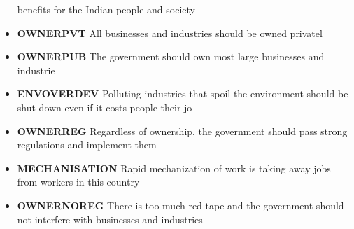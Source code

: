 \documentclass[
]{article}
\begin{document}
\begin{itemize}
  benefits for the Indian people and society
\item
  \textbf{OWNERPVT} All businesses and industries should be owned
  privatel
\item
  \textbf{OWNERPUB} The government should own most large businesses and
  industrie
\item
  \textbf{ENVOVERDEV} Polluting industries that spoil the environment
  should be shut down even if it costs people their jo
\item
  \textbf{OWNERREG} Regardless of ownership, the government should pass
  strong regulations and implement them
\item
  \textbf{MECHANISATION} Rapid mechanization of work is taking away jobs
  from workers in this country
\item
  \textbf{OWNERNOREG} There is too much red-tape and the government
  should not interfere with businesses and industries
\end{itemize}
\end{document}
